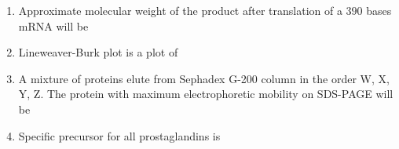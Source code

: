 \documentclass[journal,12pt,onecolumn]{IEEEtran}
\theoremstyle{remark}
\begin{document}
\begin{enumerate}
\item Approximate molecular weight  of the product after translation of a $390$ bases mRNA will be 
\hfill{}

\begin{enumerate}
\end{enumerate}

\item Lineweaver-Burk plot is a plot of 
\hfill{}

\begin{enumerate}
\end{enumerate}

\item A mixture of proteins  elute from Sephadex G-200 column in the order W, X, Y, Z. The protein with maximum electrophoretic mobility on SDS-PAGE will be 
\hfill{}

\begin{enumerate}
\end{enumerate}

\item Specific precursor for all prostaglandins is 
\hfill{}

\begin{enumerate}
\end{enumerate}


\end{enumerate}
\end{document}
